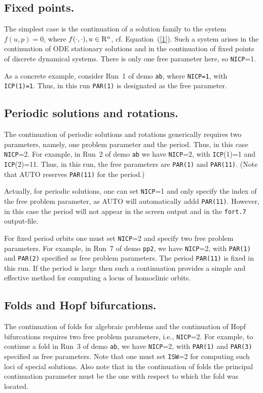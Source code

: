 \documentclass[12pt]{report}
\def\Rn{{\rm R}^n}
\begin{document}
\subsection{ Fixed points.}
The simplest case is the continuation of a solution family to the system
$ f( u , p ) = 0$,  where $f(\cdot,\cdot), u \in \Rn$, cf. Equation~(\ref{1}).
Such a system arises in the continuation of ODE stationary solutions and 
in the continuation of fixed points of discrete dynamical systems.
There is only one free parameter here, so {\tt NICP}=1.

As a concrete example, consider Run~1 of demo {\tt ab},
where {\tt NICP=1}, with {\tt ICP(1)=1}. 
Thus, in this run {\tt PAR(1)} is designated as the free parameter.

\subsection{ Periodic solutions and rotations.}
The continuation of periodic solutions and rotations generically requires 
two parameters, namely, one problem parameter and the period.
Thus, in this case  {\tt NICP}=2.
For example, in Run~2 of demo {\tt ab} we have {\tt NICP}=2,
with {\tt ICP}(1)=1 and {\tt ICP}(2)=11.
Thus, in this run, the free parameters are {\tt PAR(1)} and {\tt PAR(11)}.
(Note that {\cal AUTO} reserves {\tt PAR(11)} for the period.)

Actually, for periodic solutions, one can set {\tt NICP}=1 and only specify 
the index of the free problem parameter, as {\cal AUTO} will automatically 
addd {\tt PAR(11)}.
However, in this case the period will not appear in the screen output 
and in the {\tt fort.7} output-file. 

For fixed period orbits one must set {\tt NICP}=2 and specify two free problem 
parameters.
For example, in Run~7 of demo {\tt pp2}, we have {\tt NICP}=2, with 
{\tt PAR(1)} and {\tt PAR(2)}
specified as free problem parameters.
The period {\tt PAR(11)} is fixed in this run.
If the period is large then such a continuation provides a simple and 
effective method for computing a locus of homoclinic orbits.
\subsection{ Folds and Hopf bifurcations.}
The continuation of folds for algebraic problems and the continuation of
Hopf bifurcations requires two free problem parameters, i.e.,  {\tt NICP}=2.
For example, to continue a fold in Run~3 of demo {\tt ab}, we have {\tt NICP}=2, 
with {\tt PAR(1)} and {\tt PAR(3)} specified as free parameters.
Note that one must set {\tt ISW}=2 for computing such loci of special solutions.
Also note that in the continuation of folds the principal continuation parameter
must be the one with respect to which the fold was located.
\end{document}
